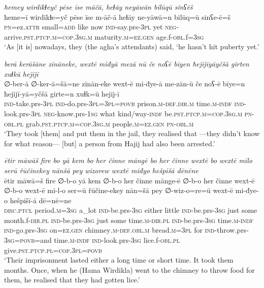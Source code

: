 \ea \label{BP.132}
\textit{ħemey wirdīkɫeyč pēse īse māčā, heɫāy neyāwān bilūqū sinʕēš} \\ 
\gll ħeme=ī wirdīkɫe=yč pēse īse m-āč-ā heɫāy ne-yāwā=n bilūq=ū sinʕe-ē=š \\ 
 \textsc{pn}=ez.\textsc{attr} small\textsc{=add} like now \textsc{ind-}say.prs\textsc{-3pl} yet \textsc{neg-}arrive\textsc{.pst}\textsc{.ptcp}\textsc{.m}\textsc{=cop}\textsc{.3sg}\textsc{.m} maturity\textsc{.m}\textsc{=ez.gen} age.f\textsc{-obl}.f\textsc{=3sg} \\ 
\glt `As [it is] nowadays, they (the agha’s attendants) said, ‘he hasn’t hit puberty yet.'
\z 
 
\ea \label{BP.139}
\textit{berā kerāšāne zīnāneke, wextē miđyā mezā nū če noʕē bīyen ħejījīyāyčšā girten xuɫkū hejījī} \\ 
\gll ∅-ber-ā ∅-ker-ā=šā=ne zīnān-eke wext-ē mi-đye-ā me-zān-ū če noʕ-ē bīye=n ħejījī-yā=yčšā girte=n xuɫk=ū hejīj-ī \\ 
 \textsc{ind-}take.prs\textsc{-3pl} \textsc{ind-}do.prs\textsc{-3pl}\textsc{=3pl}\textsc{=\textsc{povb}} prison\textsc{.m}\textsc{-def}\textsc{.dir}\textsc{.m} time\textsc{.m}\textsc{-indf} \textsc{ind-}look.prs\textsc{-3pl} \textsc{neg-}know.prs\textsc{-\textsc{1sg}} what kind/way\textsc{-indf} be\textsc{.pst}\textsc{.ptcp}\textsc{.m}\textsc{=cop}\textsc{.3sg}\textsc{.m} \textsc{pn}\textsc{-obl}\textsc{.pl} grab\textsc{.pst}\textsc{.ptcp}\textsc{.m}\textsc{=cop}\textsc{.3sg}\textsc{.m} people\textsc{.m}\textsc{=ez.gen} \textsc{pn}\textsc{-obl}\textsc{.m} \\ 
\glt `They took [them] and put them in the jail, they realised that —they didn’t know for what reason— [but] a person from Hajij had also been arrested.'
\z 
 
\ea \label{BP.149}
\textit{ētir māwāš fire bo yā kem bo her činne māngē bo her činne wextē bo wextē milo serū řūčinekey nānšā pey wizorew wextē miđyo hešpišā dēnēne} \\ 
\gll ētir māwā=š fire ∅-b-o yā kem ∅-b-o her činne mānge-ē ∅-b-o her činne wext-ē ∅-b-o wext-ē mi-l-o ser=ū řūčine-ekey nān=šā pey ∅-wiz-o=re=ū wext-ē mi-đye-o hešpišī-ā dē=nē=ne \\ 
 \textsc{disc.ptcl} period\textsc{.m}\textsc{=3sg} a\_lot \textsc{ind-}be.prs\textsc{-3sg} either little \textsc{ind-}be.prs\textsc{-3sg} just some month.f\textsc{-dir}\textsc{.pl} \textsc{ind-}be.prs\textsc{-3sg} just some time\textsc{.m}\textsc{-dir}\textsc{.pl} \textsc{ind-}be.prs\textsc{-3sg} time\textsc{.m}\textsc{-indf} \textsc{ind-}go.prs\textsc{-3sg} on\textsc{=ez.gen} chimney\textsc{.m}\textsc{-def}\textsc{.obl}\textsc{.m} bread\textsc{.m}\textsc{=3pl} for \textsc{ind-}throw.prs\textsc{-3sg}\textsc{=\textsc{povb}}=and time\textsc{.m}\textsc{-indf} \textsc{ind-}look.prs\textsc{-3sg} lice.f\textsc{-obl}\textsc{.pl} give\textsc{.pst}\textsc{.ptcp}\textsc{.pl}\textsc{=cop}\textsc{.3pl}\textsc{=\textsc{povb}} \\ 
\glt `Their imprisonment lasted either a long time or short time. It took them months. Once, when he (Hama Wirdikla) went to the chimney to throw food for them, he realised that they had gotten lice.'
\z 
 
